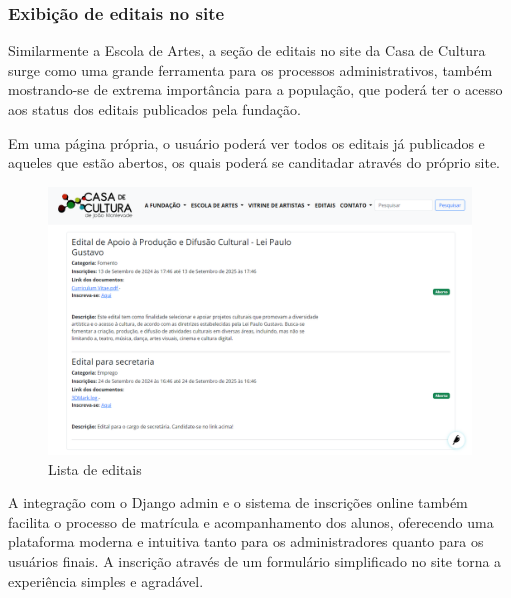 \subsubsection{Exibição de editais no site}

Similarmente a Escola de Artes, a seção de editais no site da Casa de Cultura surge como uma grande ferramenta para os processos administrativos, também mostrando-se de extrema importância para a população, que poderá ter o acesso aos status dos editais publicados pela fundação.

Em uma página própria, o usuário poderá ver todos os editais já publicados e aqueles que estão abertos, os quais poderá se canditadar através do próprio site.

\begin{figure}[htb]
	\caption{\label{fig_grafico}Lista de editais}
	\begin{center}
	    \includegraphics[scale=0.25]{./img/lista_editais.png}
	\end{center}
\end{figure}

A integração com o Django admin e o sistema de inscrições online também facilita o processo de matrícula e acompanhamento dos alunos, oferecendo uma plataforma moderna e intuitiva tanto para os administradores quanto para os usuários finais. A inscrição através de um formulário simplificado no site torna a experiência simples e agradável.

